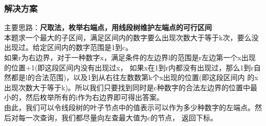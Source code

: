     \subsubsection{解决方案}
        主要思路：\textbf{尺取法，枚举右端点，用线段树维护左端点的可行区间}\\
        本题求一个最大的子区间，满足区间内的数字要么出现次数大于等于k次，要么没出现过。给定区间内的数字范围是1到c。\\
        如果r为右边界，对于一种数字x，满足条件的左边界l的范围是r左边第一个x出现的位置+1(即这段区间内没有出现过x，
        如果x在1到r内都没有出现过，那么1到r自然都是l的合法范围)，以及1到从右往左数数第k个x出现的位置(即这段区间内
        的x出现次数大于等于k)。所以我们只要找到同时是c种数字的合法左边界的位置中最小的，然后枚举所有的i作为右边界即可得出答案。\\
        由此，我们可以令线段树的叶子节点中的值表示可以作为多少种数字的左端点。然后对每一次查询，我们都尽量向左查最大值为c的节点，
        返回下标。
